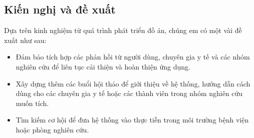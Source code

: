 \subsection*{Kiến nghị và đề xuất}


Dựa trên kinh nghiệm từ quá trình phát triển đồ án, chúng em có một vài đề xuất như sau:

\begin{adjustwidth}{1.5em}{}
  \begin{itemize}
      \item Đảm bảo tích hợp các phản hồi từ người dùng, chuyên gia y tế và các nhóm nghiên cứu để liên tục cải thiện và hoàn thiện ứng dụng.

  
      \item Xây dựng thêm các buổi hội thảo để giới thiệu về hệ thống, hướng dẫn cách dùng cho các chuyên gia y tế hoặc các thành viên trong nhóm nghiên cứu muốn tích.

  
      \item Tìm kiếm cơ hội để đưa hệ thống vào thực tiễn trong môi trường bệnh viện hoặc phòng nghiên cứu.

    \end{itemize}
  \end{adjustwidth}



\cleardoublepage